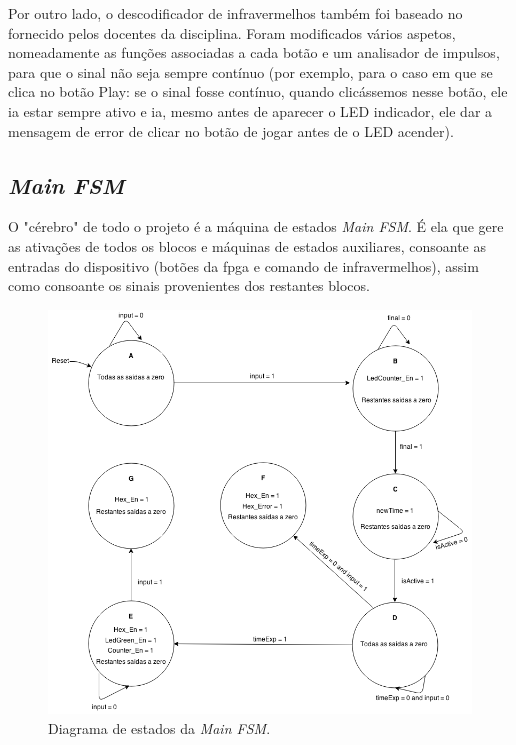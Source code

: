 \documentclass[a4paper,11pt,onecolumn]{report}
\begin{document}
Por outro lado, o descodificador de infravermelhos também foi baseado no fornecido pelos docentes da disciplina. Foram modificados vários aspetos, nomeadamente as funções associadas a cada botão e um analisador de impulsos, para que o sinal não seja sempre contínuo (por exemplo, para o caso em que se clica no botão Play: se o sinal fosse contínuo, quando clicássemos nesse botão, ele ia estar sempre ativo e ia, mesmo antes de aparecer o LED indicador, ele dar a mensagem de error de clicar no botão de jogar antes de o LED acender).

\subsection{\textit{Main FSM}}

O "cérebro" de todo o projeto é a máquina de estados \textit{Main FSM}. É ela que gere as ativações de todos os blocos e máquinas de estados auxiliares, consoante as entradas do dispositivo (botões da \ac{fpga} e comando de infravermelhos), assim como consoante os sinais provenientes dos restantes blocos.

\begin{figure}[h]
\centerline{\includegraphics[scale=0.4]{Images/MainFSMDiagram}}
\caption{Diagrama de estados da \textit{Main FSM}.}
\label{figmainfsm}
\end{figure}
\end{document}
